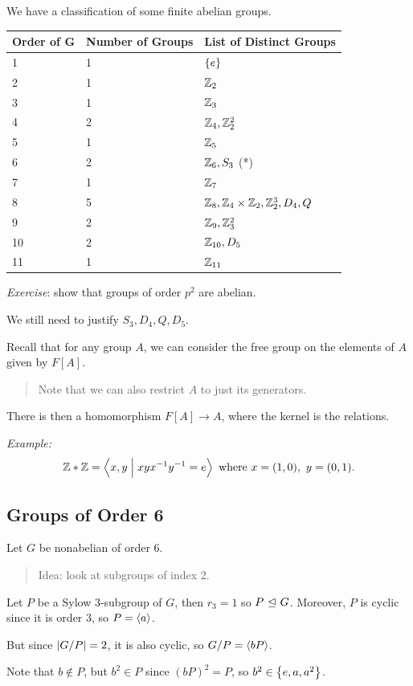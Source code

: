 We have a classification of some finite abelian groups.

\begin{longtable}[]{@{}lll@{}}
\toprule
Order of G & Number of Groups & List of Distinct Groups\tabularnewline
\midrule
\endhead
1 & 1 & \(\left\{{e}\right\}\)\tabularnewline
2 & 1 & \({\mathbb{Z}}_2\)\tabularnewline
3 & 1 & \({\mathbb{Z}}_3\)\tabularnewline
4 & 2 & \({\mathbb{Z}}_4, {\mathbb{Z}}_2^2\)\tabularnewline
5 & 1 & \({\mathbb{Z}}_5\)\tabularnewline
6 & 2 & \({\mathbb{Z}}_6, S_3\) (*)\tabularnewline
7 & 1 & \({\mathbb{Z}}_7\)\tabularnewline
8 & 5 & \({\mathbb{Z}}_8,{\mathbb{Z}}_4 \times {\mathbb{Z}}_2, {\mathbb{Z}}_2^3, D_4, Q\)\tabularnewline
9 & 2 & \({\mathbb{Z}}_9, {\mathbb{Z}}_3^2\)\tabularnewline
10 & 2 & \({\mathbb{Z}}_{10}, D_5\)\tabularnewline
11 & 1 & \({\mathbb{Z}}_{11}\)\tabularnewline
\bottomrule
\end{longtable}

\emph{Exercise}: show that groups of order \(p^2\) are abelian.

We still need to justify \(S_3, D_4, Q, D_5\).

Recall that for any group \(A\), we can consider the free group on the
elements of \(A\) given by \(F[A]\).

\begin{quote}
Note that we can also restrict \(A\) to just its generators.
\end{quote}

There is then a homomorphism \(F[A] \to A\), where the kernel is the
relations.

\emph{Example:} \[
{\mathbb{Z}} \ast {\mathbb{Z}} = \left\langle{x, y \mathrel{\Big|}xyx^{-1}y^{-1}= e}\right\rangle \text{ where } x = (1, 0),~ y = (0, 1)
.\]

\hypertarget{groups-of-order-6}{%
\subsection{Groups of Order 6}\label{groups-of-order-6}}

Let \(G\) be nonabelian of order \(6\).

\begin{quote}
Idea: look at subgroups of index 2.
\end{quote}

Let \(P\) be a Sylow 3-subgroup of \(G\), then \(r_3 = 1\) so
\(P{~\trianglelefteq~} G\). Moreover, \(P\) is cyclic since it is order 3, so
\(P = \left\langle{a}\right\rangle\).

But since \({\left\lvert {G/P} \right\rvert} = 2\), it is also cyclic, so
\(G/P = \left\langle{bP}\right\rangle\).

Note that \(b\not\in P\), but \(b^2 \in P\) since \((bP)^2 = P\), so
\(b^2 \in \left\{{e, a, a^2}\right\}\).

